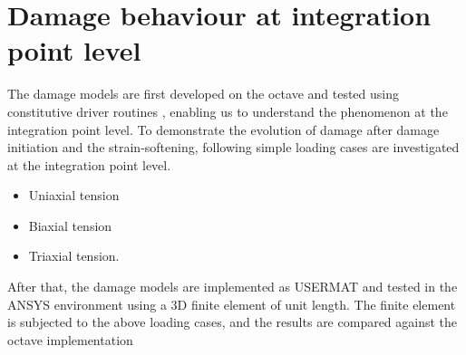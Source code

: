 \documentclass[12pt,a4paper,twoside,openright]{report}
\begin{document}
\section{Damage behaviour at integration point level}
\indent\indent\indent The damage models are first developed on the octave and tested using constitutive driver routines \citep{codes}, enabling us to understand the phenomenon at the integration point level. To demonstrate the evolution of damage after damage initiation and the strain-softening, following simple loading cases are investigated at the integration point level.
\begin{itemize}
\item Uniaxial tension
\item Biaxial tension
\item Triaxial tension.
\end{itemize} 
After that, the damage models are implemented as USERMAT and tested in the ANSYS environment using a 3D finite element of unit length. The finite element is subjected to the above loading cases, and the results are compared against the octave implementation
\FloatBarrier
\end{document}
